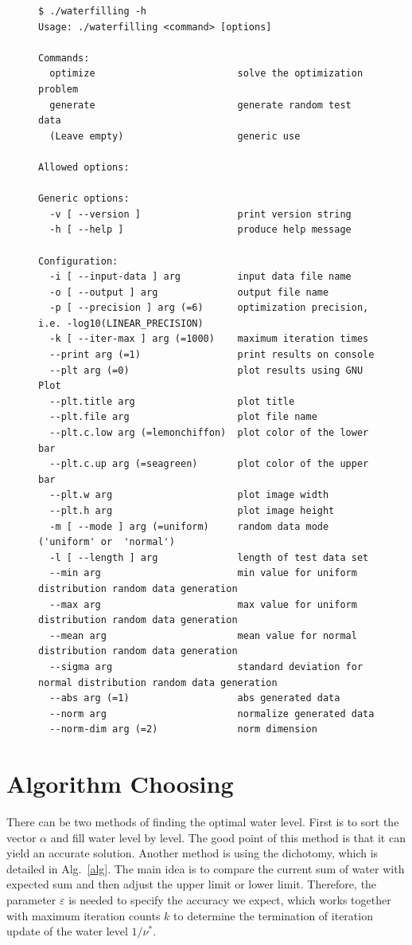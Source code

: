 \documentclass[journal,twoside]{IEEEtran}
\begin{document}
    \begin{figure}[t]
      \begin{lstlisting}[morekeywords={\$}]
$ ./waterfilling -h
Usage: ./waterfilling <command> [options]

Commands:
  optimize                         solve the optimization problem
  generate                         generate random test data
  (Leave empty)                    generic use

Allowed options:

Generic options:
  -v [ --version ]                 print version string
  -h [ --help ]                    produce help message

Configuration:
  -i [ --input-data ] arg          input data file name
  -o [ --output ] arg              output file name
  -p [ --precision ] arg (=6)      optimization precision, i.e. -log10(LINEAR_PRECISION)
  -k [ --iter-max ] arg (=1000)    maximum iteration times
  --print arg (=1)                 print results on console
  --plt arg (=0)                   plot results using GNU Plot
  --plt.title arg                  plot title
  --plt.file arg                   plot file name
  --plt.c.low arg (=lemonchiffon)  plot color of the lower bar
  --plt.c.up arg (=seagreen)       plot color of the upper bar
  --plt.w arg                      plot image width
  --plt.h arg                      plot image height
  -m [ --mode ] arg (=uniform)     random data mode ('uniform' or  'normal')
  -l [ --length ] arg              length of test data set
  --min arg                        min value for uniform distribution random data generation
  --max arg                        max value for uniform distribution random data generation
  --mean arg                       mean value for normal distribution random data generation
  --sigma arg                      standard deviation for normal distribution random data generation
  --abs arg (=1)                   abs generated data
  --norm arg                       normalize generated data
  --norm-dim arg (=2)              norm dimension
      \end{lstlisting}
    \end{figure}

  \section{Algorithm Choosing}\label{sec:alg}

    \IEEEpubidadjcol
    There can be two methods of finding the optimal water level.
    First is to sort the vector $\alpha$ and fill water level by level.
    The good point of this method is that it can yield an accurate solution.
    Another method is using the dichotomy, which is detailed in Alg.~\ref{alg}.
    The main idea is to compare the current sum of water with expected sum and then adjust the upper limit or lower limit.
    Therefore, the parameter $\varepsilon$ is needed to specify the accuracy we expect, which works together with maximum iteration counts $k$ to determine the termination of iteration update of the water level $1/\nu^*$.
\end{document}
